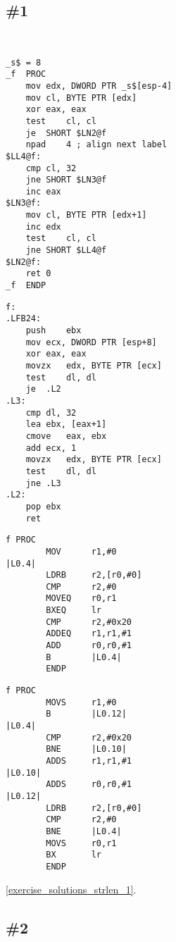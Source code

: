 \section{\Exercises}

\subsection{\Exercise \#1}
\label{exercise_strlen_1}

\WhatThisCodeDoes\

\begin{lstlisting}[caption=MSVC 2010 /Ox]
_s$ = 8			
_f	PROC
	mov	edx, DWORD PTR _s$[esp-4]
	mov	cl, BYTE PTR [edx]
	xor	eax, eax
	test	cl, cl
	je	SHORT $LN2@f
	npad	4 ; align next label
$LL4@f:
	cmp	cl, 32	
	jne	SHORT $LN3@f
	inc	eax
$LN3@f:
	mov	cl, BYTE PTR [edx+1]
	inc	edx
	test	cl, cl
	jne	SHORT $LL4@f
$LN2@f:
	ret	0
_f	ENDP
\end{lstlisting}

\begin{lstlisting}[caption=GCC 4.8.1 -O3]
f:
.LFB24:
	push	ebx
	mov	ecx, DWORD PTR [esp+8]
	xor	eax, eax
	movzx	edx, BYTE PTR [ecx]
	test	dl, dl
	je	.L2
.L3:
	cmp	dl, 32
	lea	ebx, [eax+1]
	cmove	eax, ebx
	add	ecx, 1
	movzx	edx, BYTE PTR [ecx]
	test	dl, dl
	jne	.L3
.L2:
	pop	ebx
	ret
\end{lstlisting}

\begin{lstlisting}[caption=Keil 5.03 (\ARMMode) -O3]
f PROC
        MOV      r1,#0
|L0.4|
        LDRB     r2,[r0,#0]
        CMP      r2,#0
        MOVEQ    r0,r1
        BXEQ     lr
        CMP      r2,#0x20
        ADDEQ    r1,r1,#1
        ADD      r0,r0,#1
        B        |L0.4|
        ENDP
\end{lstlisting}

\begin{lstlisting}[caption=Keil 5.03 (\ThumbMode) -O3]
f PROC
        MOVS     r1,#0
        B        |L0.12|
|L0.4|
        CMP      r2,#0x20
        BNE      |L0.10|
        ADDS     r1,r1,#1
|L0.10|
        ADDS     r0,r0,#1
|L0.12|
        LDRB     r2,[r0,#0]
        CMP      r2,#0
        BNE      |L0.4|
        MOVS     r0,r1
        BX       lr
        ENDP
\end{lstlisting}

\Answer\: \ref{exercise_solutions_strlen_1}.

\subsection{\Exercise \#2}
\label{exercise_strlen_2}

